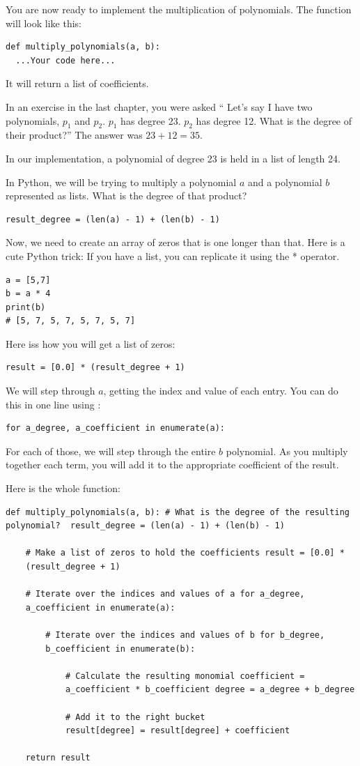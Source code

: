 You are now ready to implement the multiplication of polynomials. The function will look like this:
\begin{verbatim}
def multiply_polynomials(a, b):
  ...Your code here...
\end{verbatim}
It will return a list of coefficients.

In an exercise in the last chapter, you were asked `` Let's say I have
two polynomials, $p_1$ and $p_2$.  $p_1$ has degree 23.  $p_2$ has
degree 12.  What is the degree of their product?'' The answer was $23 +
12 = 35$.

In our implementation, a polynomial of degree 23 is held in a list of length 24.

In Python, we will be trying to multiply a polynomial $a$ and a
polynomial $b$ represented as lists. What is the degree of that product?
\begin{verbatim}
result_degree = (len(a) - 1) + (len(b) - 1)
\end{verbatim}

Now, we need to create an array of zeros that is one longer than that. Here is a cute Python trick: If you have a list, you can replicate it using the * operator. 
\begin{verbatim}
a = [5,7]
b = a * 4
print(b)
# [5, 7, 5, 7, 5, 7, 5, 7]
\end{verbatim}

Here iss how you will get a list of zeros:
\begin{verbatim}
result = [0.0] * (result_degree + 1)
\end{verbatim}

We will step through $a$, getting the index and value of each entry. You can do this in one line using :
\begin{verbatim}
for a_degree, a_coefficient in enumerate(a):
\end{verbatim}
For each of those, we will step through the entire $b$ polynomial. As
you multiply together each term, you will add it to the appropriate
coefficient of the result.

Here is the whole function:
\begin{verbatim}
def multiply_polynomials(a, b): # What is the degree of the resulting
polynomial?  result_degree = (len(a) - 1) + (len(b) - 1)

    # Make a list of zeros to hold the coefficients result = [0.0] *
    (result_degree + 1)

    # Iterate over the indices and values of a for a_degree,
    a_coefficient in enumerate(a):

        # Iterate over the indices and values of b for b_degree,
        b_coefficient in enumerate(b):

            # Calculate the resulting monomial coefficient =
            a_coefficient * b_coefficient degree = a_degree + b_degree
            
            # Add it to the right bucket
            result[degree] = result[degree] + coefficient
            
    return result
\end{verbatim}

